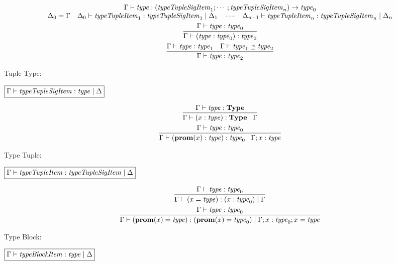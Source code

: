 \begin{gather*}
{    \begin{array}{c}
      \Gamma \vdash \mathit{type}: (\mathit{typeTupleSigItem}_1; \cdots; \mathit{typeTupleSigItem}_n) \rightarrow \mathit{type}_0
      \\
      \Delta_0 = \Gamma
      \hspace{1em}
      \Delta_0 \vdash \mathit{typeTupleItem}_1: \mathit{typeTupleSigItem}_1 \mid \Delta_1
      \hspace{1em}
      \cdots
      \hspace{1em}
      \Delta_{n - 1} \vdash \mathit{typeTupleItem}_n: \mathit{typeTupleSigItem}_n \mid \Delta_n
    \end{array}
  }
  \\
  \infer{\Gamma \vdash (\mathit{type}: \mathit{type}_0): \mathit{type}_0}{
    \Gamma \vdash \mathit{type}: \mathit{type}_0
  }
  \\
  \infer{\Gamma \vdash \mathit{type}: \mathit{type}_2}{
    \Gamma \vdash \mathit{type}: \mathit{type}_1
    &
    \Gamma \vdash \mathit{type}_1 \preceq \mathit{type}_2
  }
\end{gather*}

Tuple Type:

$\fbox{$\Gamma \vdash \mathit{typeTupleSigItem}: \mathit{type} \mid \Delta$}$

\begin{gather*}
  \infer{\Gamma \vdash (x: \mathit{type}): \mathbf{Type} \mid \Gamma}{
    \Gamma \vdash \mathit{type}: \mathbf{Type}
  }
  \\
  \infer{\Gamma \vdash (\mathbf{prom}(x): \mathit{type}): \mathit{type}_0 \mid \Gamma; x: \mathit{type}}{
    \Gamma \vdash \mathit{type}: \mathit{type}_0
  }
\end{gather*}

Type Tuple:

$\fbox{$\Gamma \vdash \mathit{typeTupleItem}: \mathit{typeTupleSigItem} \mid \Delta$}$

\begin{gather*}
  \infer{\Gamma \vdash (x = \mathit{type}): (x: \mathit{type}_0) \mid \Gamma}{
    \Gamma \vdash \mathit{type}: \mathit{type}_0
  }
  \\
  \infer{\Gamma \vdash (\mathbf{prom}(x) = \mathit{type}): (\mathbf{prom}(x) = \mathit{type}_0) \mid \Gamma; x: \mathit{type}_0; x = \mathit{type}}{
    \Gamma \vdash \mathit{type}: \mathit{type}_0
  }
\end{gather*}

Type Block:

$\fbox{$\Gamma \vdash \mathit{typeBlockItem}: \mathit{type} \mid \Delta$}$

